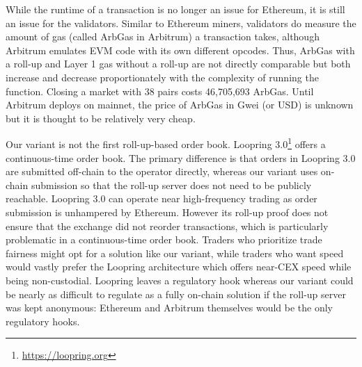  
 

 
 
While the runtime of a transaction is no longer an issue for Ethereum, it is still an issue for the validators. Similar to Ethereum miners, validators do measure the amount of gas (called ArbGas in Arbitrum) a transaction takes, although Arbitrum emulates EVM code with its own different opcodes. Thus, ArbGas with a roll-up and Layer 1 gas without a roll-up are not directly comparable but both increase and decrease proportionately with the complexity of running the function. Closing a market with 38 pairs costs 46,705,693 ArbGas. Until Arbitrum deploys on mainnet, the price of ArbGas in Gwei (or USD) is unknown but it is thought to be relatively very cheap.

 
Our \cm variant is not the first roll-up-based order book. Loopring 3.0\footnote{\url{https://loopring.org}} offers a continuous-time order book. The primary difference is that orders in Loopring 3.0 are submitted off-chain to the operator directly, whereas our variant uses on-chain submission so that the roll-up server does not need to be publicly reachable. Loopring 3.0 can operate near high-frequency trading as order submission is unhampered by Ethereum. However its  roll-up proof does not ensure that the exchange did not reorder transactions, which is particularly problematic in a continuous-time order book. Traders who prioritize trade fairness might opt for a solution like our variant, while traders who want speed would vastly prefer the Loopring architecture which offers near-CEX speed while being non-custodial. Loopring leaves a regulatory hook whereas our variant could be nearly as difficult to regulate as a fully on-chain solution if the roll-up server was kept anonymous: Ethereum and Arbitrum themselves would be the only regulatory hooks. 
 
